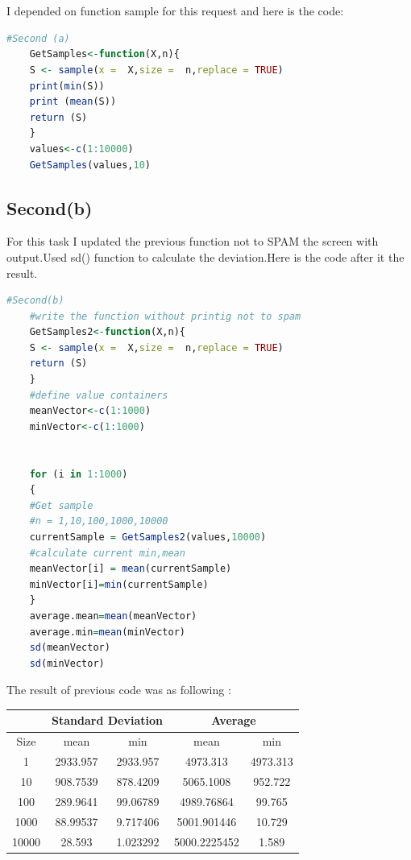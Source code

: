 \documentclass{article}
\begin{document}
	\section*{}
	\subsection*{}
	I depended on function sample for this request and here is the code:
	\begin{lstlisting}[language=R]
	#Second (a)
	GetSamples<-function(X,n){
	S <- sample(x =  X,size =  n,replace = TRUE)
	print(min(S))
	print (mean(S))
	return (S)
	}
	values<-c(1:10000)
	GetSamples(values,10)
	\end{lstlisting}
	\subsection*{Second(b)}
	For this task I updated the previous function not to SPAM the screen with output.Used sd() function to calculate the deviation.Here is the code after it the result.
	\begin{lstlisting}[language=R]
	#Second(b)
	#write the function without printig not to spam
	GetSamples2<-function(X,n){
	S <- sample(x =  X,size =  n,replace = TRUE)
	return (S)
	}
	#define value containers 
	meanVector<-c(1:1000)
	minVector<-c(1:1000)
	
	
	for (i in 1:1000)
	{
	#Get sample 
	#n = 1,10,100,1000,10000 
	currentSample = GetSamples2(values,10000)
	#calculate current min,mean
	meanVector[i] = mean(currentSample)
	minVector[i]=min(currentSample)
	}
	average.mean=mean(meanVector)
	average.min=mean(minVector)
	sd(meanVector)
	sd(minVector)
	\end{lstlisting}
	The result of previous code was as following :\\
	
	\begin{tabular}{|c|c|c|c|c|}
		\hline
		&\multicolumn{2}{c|}{Standard Deviation }&\multicolumn{2}{c|}{Average}\\
		\hline
		Size&mean&min&mean&min\\
		\hline
		1&2933.957&2933.957&4973.313&4973.313\\
		\hline
		10&908.7539&878.4209&5065.1008&952.722\\
		\hline
		100&289.9641&99.06789&4989.76864&99.765\\
		\hline
		1000&88.99537&9.717406&5001.901446&10.729\\
		\hline
		10000&28.593&1.023292&5000.2225452&1.589\\
		\hline 
	\end{tabular}\\
	
\end{document}
